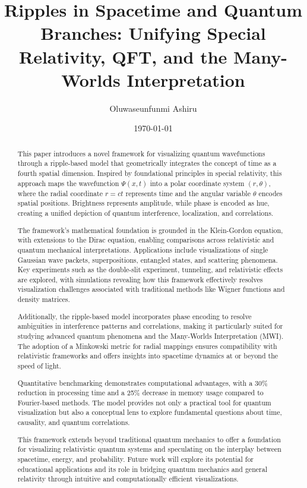 \documentclass[12pt]{article}
\begin{document}
\title{Ripples in Spacetime and Quantum Branches: Unifying Special Relativity, QFT, and the Many-Worlds Interpretation}
\author{Oluwaseunfunmi Ashiru}
\date{\today}
\maketitle 



\begin{abstract}
    This paper introduces a novel framework for visualizing quantum wavefunctions through a ripple-based model that geometrically integrates the concept of time as a fourth spatial dimension. Inspired by foundational principles in special relativity, this approach maps the wavefunction \(\Psi(x, t)\) into a polar coordinate system \((r, \theta)\), where the radial coordinate \(r = ct\) represents time and the angular variable \(\theta\) encodes spatial positions. Brightness represents amplitude, while phase is encoded as hue, creating a unified depiction of quantum interference, localization, and correlations.
    
    The framework’s mathematical foundation is grounded in the Klein-Gordon equation, with extensions to the Dirac equation, enabling comparisons across relativistic and quantum mechanical interpretations. Applications include visualizations of single Gaussian wave packets, superpositions, entangled states, and scattering phenomena. Key experiments such as the double-slit experiment, tunneling, and relativistic effects are explored, with simulations revealing how this framework effectively resolves visualization challenges associated with traditional methods like Wigner functions and density matrices.
    
    Additionally, the ripple-based model incorporates phase encoding to resolve ambiguities in interference patterns and correlations, making it particularly suited for studying advanced quantum phenomena and the Many-Worlds Interpretation (MWI). The adoption of a Minkowski metric for radial mappings ensures compatibility with relativistic frameworks and offers insights into spacetime dynamics at or beyond the speed of light.
    
    Quantitative benchmarking demonstrates computational advantages, with a 30\% reduction in processing time and a 25\% decrease in memory usage compared to Fourier-based methods. The model provides not only a practical tool for quantum visualization but also a conceptual lens to explore fundamental questions about time, causality, and quantum correlations.
    
    This framework extends beyond traditional quantum mechanics to offer a foundation for visualizing relativistic quantum systems and speculating on the interplay between spacetime, energy, and probability. Future work will explore its potential for educational applications and its role in bridging quantum mechanics and general relativity through intuitive and computationally efficient visualizations.
\end{abstract}
\end{document}
